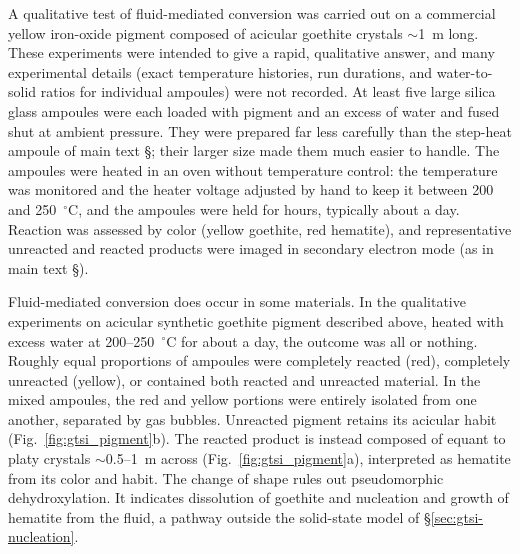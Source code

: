 A qualitative test of fluid-mediated conversion was carried out on a commercial yellow iron-oxide
pigment composed of acicular goethite crystals $\sim$1~\textmu m long.
These experiments were intended to give a rapid, qualitative answer, and many experimental
details (exact temperature histories, run durations, and water-to-solid ratios for individual
ampoules) were not recorded. At least five large silica glass ampoules were each loaded with
pigment and an excess of water and fused shut at ambient pressure. They were prepared far
less carefully than the step-heat ampoule of main text \S\MainRefMethodsGoethite; their larger
size made them much easier to handle. The ampoules were heated in an oven without temperature
control: the temperature was monitored and the heater voltage adjusted by hand to keep it
between 200 and 250~$^\circ$C, and the ampoules were held for hours, typically about a day.
Reaction was assessed by color (yellow goethite, red hematite), and representative unreacted and
reacted products were imaged in secondary electron mode (as in main text \S\MainRefMethodsSEM).

Fluid-mediated conversion does occur in some materials. In the qualitative experiments on
acicular synthetic goethite pigment described above, heated with excess water at
200--250~$^\circ$C for about a day, the outcome was all or nothing. Roughly equal proportions of
ampoules were completely reacted (red), completely unreacted (yellow), or contained both
reacted and unreacted material. In the mixed ampoules, the red and yellow portions were entirely
isolated from one another, separated by gas bubbles. Unreacted pigment retains its acicular habit
(Fig.~\ref{fig:gtsi_pigment}b). The reacted product is instead composed of equant to platy crystals
$\sim$0.5--1~\textmu m across (Fig.~\ref{fig:gtsi_pigment}a), interpreted as hematite from its color
and habit. The change of shape rules out pseudomorphic dehydroxylation. It indicates dissolution of
goethite and nucleation and growth of hematite from the fluid, a pathway outside the solid-state
model of \S\ref{sec:gtsi-nucleation}.

